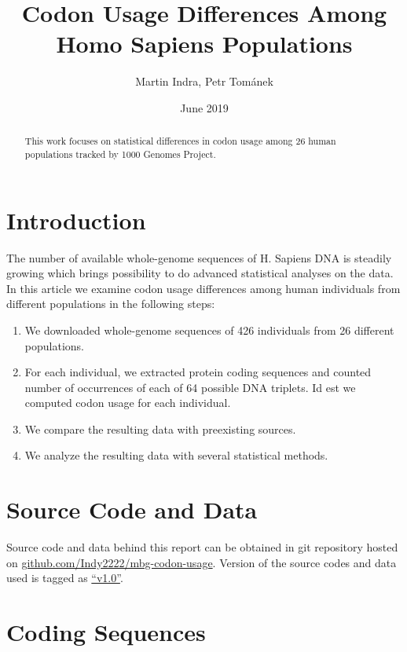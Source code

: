 \documentclass{article}
\title{Codon Usage Differences Among Homo Sapiens Populations}
\author{Martin Indra, Petr Tománek}
\date{June 2019}
\begin{document}
\begin{titlepage}
\maketitle
\end{titlepage}

\begin{abstract}
  This work focuses on statistical differences in codon usage among 26 human
  populations tracked by 1000 Genomes Project.
\end{abstract}

\clearpage

\section{Introduction}

The number of available whole-genome sequences of H. Sapiens DNA is steadily
growing which brings possibility to do advanced statistical analyses on the
data. In this article we examine codon usage differences among human
individuals from different populations in the following steps:

\begin{enumerate}
\item We downloaded whole-genome sequences of 426 individuals from 26 different
  populations.
\item For each individual, we extracted protein coding sequences and counted
  number of occurrences of each of 64 possible DNA triplets. Id est we computed
  codon usage for each individual.
\item We compare the resulting data with preexisting sources.
\item We analyze the resulting data with several statistical methods.
\end{enumerate}

\section{Source Code and Data}

Source code and data behind this report can be obtained in git repository
hosted on
\href{https://github.com/Indy2222/mbg-codon-usage}{github.com/Indy2222/mbg-codon-usage}.
Version of the source codes and data used is tagged as
\href{https://github.com/Indy2222/mbg-codon-usage/releases/tag/v1.0}{``v1.0''}.

\section{Coding Sequences}
\end{document}
